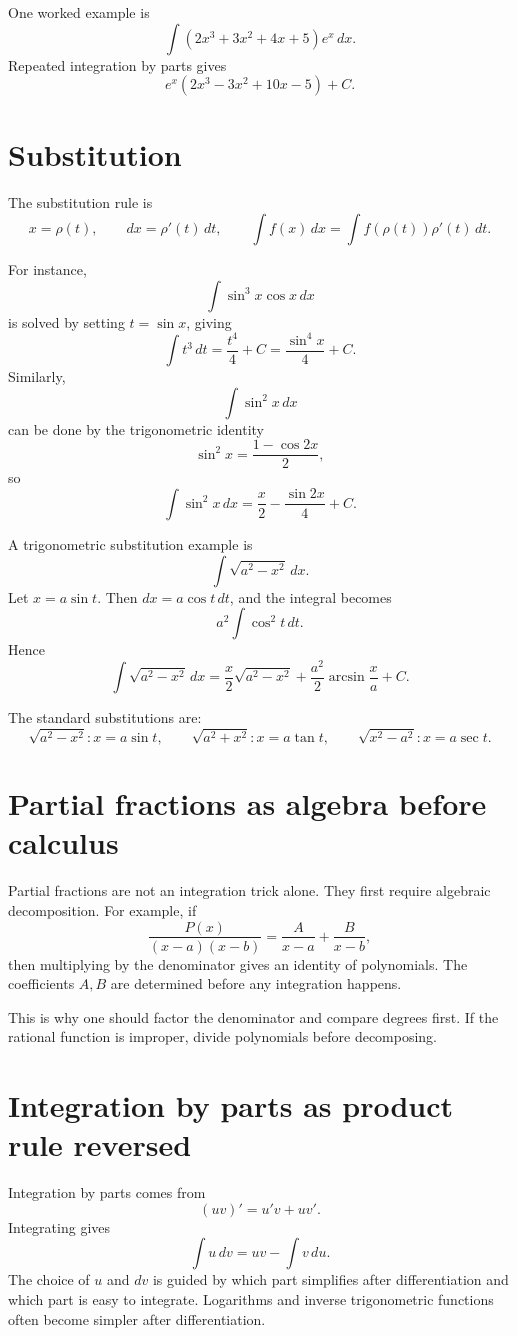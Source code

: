 One worked example is
\[
  \int(2x^3+3x^2+4x+5)e^x\,dx.
\]
Repeated integration by parts gives
\[
  e^x(2x^3-3x^2+10x-5)+C.
\]

\section{Substitution}

The substitution rule is
\[
  x=\rho(t),\qquad dx=\rho'(t)\,dt,\qquad
  \int f(x)\,dx=\int f(\rho(t))\rho'(t)\,dt.
\]

For instance,
\[
  \int \sin^3x\cos x\,dx
\]
is solved by setting \(t=\sin x\), giving
\[
  \int t^3\,dt=\frac{t^4}{4}+C=\frac{\sin^4x}{4}+C.
\]
Similarly,
\[
  \int \sin^2x\,dx
\]
can be done by the trigonometric identity
\[
  \sin^2x=\frac{1-\cos2x}{2},
\]
so
\[
  \int \sin^2x\,dx=\frac x2-\frac{\sin2x}{4}+C.
\]

A trigonometric substitution example is
\[
  \int\sqrt{a^2-x^2}\,dx.
\]
Let \(x=a\sin t\).  Then \(dx=a\cos t\,dt\), and the integral becomes
\[
  a^2\int\cos^2t\,dt.
\]
Hence
\[
  \int\sqrt{a^2-x^2}\,dx
  =
  \frac x2\sqrt{a^2-x^2}+\frac{a^2}{2}\arcsin\frac xa+C.
\]

The standard substitutions are:
\[
  \sqrt{a^2-x^2}: x=a\sin t,\qquad
  \sqrt{a^2+x^2}: x=a\tan t,\qquad
  \sqrt{x^2-a^2}: x=a\sec t.
\]


\section{Partial fractions as algebra before calculus}

Partial fractions are not an integration trick alone.  They first require algebraic decomposition.  For example, if
\[
  \frac{P(x)}{(x-a)(x-b)}=\frac{A}{x-a}+\frac{B}{x-b},
\]
then multiplying by the denominator gives an identity of polynomials.  The coefficients \(A,B\) are determined before any integration happens.

This is why one should factor the denominator and compare degrees first.  If the rational function is improper, divide polynomials before decomposing.

\section{Integration by parts as product rule reversed}

Integration by parts comes from
\[
  (uv)'=u'v+uv'.
\]
Integrating gives
\[
  \int u\,dv=uv-\int v\,du.
\]
The choice of \(u\) and \(dv\) is guided by which part simplifies after differentiation and which part is easy to integrate.  Logarithms and inverse trigonometric functions often become simpler after differentiation.

